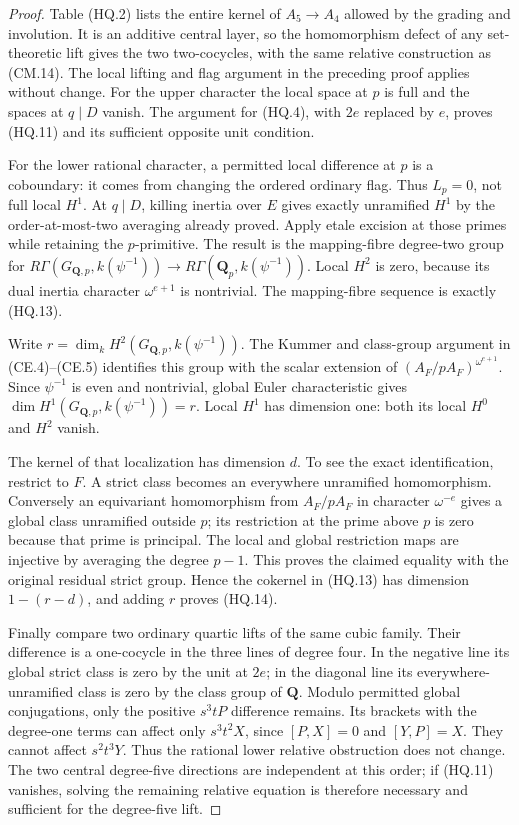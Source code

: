 \documentclass[11pt,a4paper]{article}
\theoremstyle{definition}
\begin{document}
\begin{proof}
Table (HQ.2) lists the entire kernel of
\(A_5\to A_4\) allowed by the grading and involution.
It is an additive central layer, so the homomorphism
defect of any set-theoretic lift gives the two
two-cocycles, with the same relative construction
as (CM.14).  The local lifting and flag argument
in the preceding proof applies without change.
For the upper character the local space at \(p\)
is full and the spaces at \(q\mid D\) vanish.
The argument for (HQ.4), with \(2e\) replaced by
\(e\), proves (HQ.11) and its sufficient opposite
unit condition.

For the lower rational character, a permitted
local difference at \(p\) is a coboundary: it
comes from changing the ordered ordinary flag.
Thus \(L_p=0\), not full local \(H^1\).
At \(q\mid D\), killing inertia over \(E\)
gives exactly unramified \(H^1\) by the
order-at-most-two averaging already proved.
Apply etale excision at those primes while
retaining the \(p\)-primitive.  The result is
the mapping-fibre degree-two group for
\(R\Gamma(G_{\mathbf Q,p},k(\psi^{-1}))\to
R\Gamma(\mathbf Q_p,k(\psi^{-1}))\).
Local \(H^2\) is zero, because its dual inertia
character \(\omega^{e+1}\) is nontrivial.
The mapping-fibre sequence is exactly (HQ.13).

Write \(r=\dim_k H^2(G_{\mathbf Q,p},k(\psi^{-1}))\).
The Kummer and class-group argument in (CE.4)--(CE.5)
identifies this group with the scalar extension of
\((A_F/pA_F)^{\omega^{e+1}}\).
Since \(\psi^{-1}\) is even and nontrivial,
global Euler characteristic gives
\(\dim H^1(G_{\mathbf Q,p},k(\psi^{-1}))=r\).
Local \(H^1\) has dimension one: both its
local \(H^0\) and \(H^2\) vanish.

The kernel of that localization has dimension
\(d\).  To see the exact identification, restrict
to \(F\).  A strict class becomes an everywhere
unramified homomorphism.  Conversely an equivariant
homomorphism from \(A_F/pA_F\) in character
\(\omega^{-e}\) gives a global class unramified
outside \(p\); its restriction at the prime above
\(p\) is zero because that prime is principal.
The local and global restriction maps are
injective by averaging the degree \(p-1\).
This proves the claimed equality with the
original residual strict group.  Hence the
cokernel in (HQ.13) has dimension \(1-(r-d)\),
and adding \(r\) proves (HQ.14).

Finally compare two ordinary quartic lifts of
the same cubic family.  Their difference is
a one-cocycle in the three lines of degree four.
In the negative line its global strict class
is zero by the unit at \(2e\); in the diagonal
line its everywhere-unramified class is zero
by the class group of \(\mathbf Q\).
Modulo permitted global conjugations, only
the positive \(s^3tP\) difference remains.
Its brackets with the degree-one terms can
affect only \(s^3t^2X\), since
\([P,X]=0\) and \([Y,P]=X\).
They cannot affect \(s^2t^3Y\).
Thus the rational lower relative obstruction
does not change.  The two central degree-five
directions are independent at this order;
if (HQ.11) vanishes, solving the remaining
relative equation is therefore necessary
and sufficient for the degree-five lift.
\end{proof}
\end{document}
